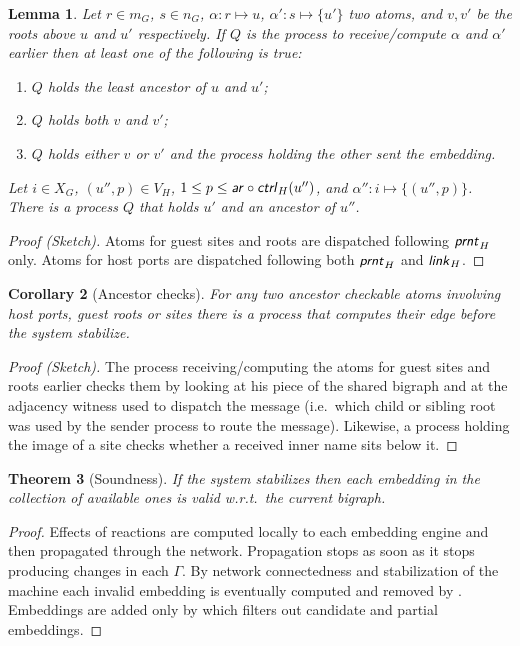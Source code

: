 \documentclass[a4paper,english,10pt]{article}
\theoremstyle{plain}\newtheorem{theorem}{Theorem}
\theoremstyle{plain}\newtheorem{corollary}[theorem]{Corollary}
\theoremstyle{plain}\newtheorem{proposition}[theorem]{Proposition}
\theoremstyle{plain}\newtheorem{lemma}[theorem]{Lemma}
\theoremstyle{plain}\newtheorem{definition}{Definition}
\theoremstyle{plain}\newtheorem{remark}{Remark}
\theoremstyle{plain}\newtheorem{example}[remark]{Example}
\newcommand{\?}[1]{}
\newcommand{\ar}{\textsf{\textit{ar}}}
\newcommand{\prnt}{\textsf{\textit{prnt}}}
\newcommand{\ctrl}{\textsf{\textit{ctrl}}}
\newcommand{\link}{\textsf{\textit{link}}}
\begin{document}
\begin{lemma}
	\label{lem:ancestor-checkable}
	Let $r \in m_G$, $s \in n_G$, 
	$\alpha : r \mapsto u$, $\alpha' : s \mapsto \{u'\}$ two
	atoms, and $v,v'$ be the roots above $u$ and $u'$ respectively. 
	If $Q$ is the process to receive/compute $\alpha$ and $\alpha'$ earlier then
	at least one of the following is true:
	\begin{enumerate}[label=(\alph*)]\itemsep=0pt
		\item
			$Q$	holds the least ancestor of $u$ and $u'$;
		\item
			$Q$ holds both $v$ and $v'$;
		\item
			$Q$ holds either $v$ or $v'$ and the
			process holding the other sent the embedding.
	\end{enumerate}
	Let $i \in X_G$, $(u'',p) \in V_H$, $1 \leq p \leq \ar\circ\ctrl_H(u'')$,
	and $\alpha'' : i \mapsto \{(u'',p)\}$. There is a process $Q$ 
	that holds $u'$ and an ancestor of $u''$.
\end{lemma}
\begin{proof}[Proof (Sketch)]
	Atoms for guest sites and roots are dispatched following $\prnt_H$ only.
	Atoms for host ports are dispatched following both $\prnt_H$ and $\link_H$.
\end{proof}

\begin{corollary}[Ancestor checks]
	\label{cor:ancestor-checkable}
	For any two ancestor checkable atoms involving host ports, guest roots or sites there is a process that computes their edge before the system
	stabilize.
\end{corollary}
\begin{proof}[Proof (Sketch)]
	The process receiving/computing the atoms for guest sites and roots
	earlier checks them by looking at his piece of the shared bigraph
	and at the adjacency witness used to dispatch the message (i.e.~which child or sibling root was used by the sender process to route the message).
	Likewise, a process holding the image of a site checks whether a received
	inner name sits below it.
\end{proof}

\begin{theorem}[Soundness]
	If the system stabilizes then each embedding
	in the collection of available ones is valid w.r.t.~the
	current bigraph.
\end{theorem}
\begin{proof}
	Effects of reactions are computed locally to each 
	embedding engine and then propagated through the network.
	Propagation stops as soon as it stops producing changes
	in each $\Gamma$. By network connectedness and stabilization
	of the machine each invalid	embedding is eventually computed
	and removed by \hyperref[algo:retract]{\withhold}. Embeddings are added only by
	\hyperref[algo:suggest]{\publish} which filters out candidate
	and partial embeddings.
\end{proof}
\end{document}
